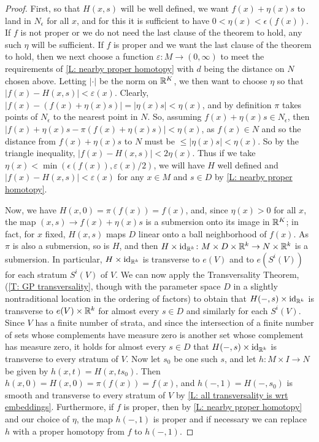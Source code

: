 \begin{proof}
	First, so that $H(x,s)$ will be well defined, we want $f(x)+ \eta(x)s$ to land in $N_\epsilon$ for all $x$, and for this it is sufficient to have $0< \eta(x) < \epsilon(f(x))$.
	If $f$ is not proper or we do not need the last clause of the theorem to hold, any such $\eta$ will be sufficient.
	If $f$ is proper and we want the last clause of the theorem to hold, then we next choose a function $\varepsilon \colon M \to (0,\infty)$ to meet the requirements of \cref{L: nearby proper homotopy} with $d$ being the distance on $N$ chosen above.
	Letting $|\cdot|$ be the norm on $\mathbb{R}^K$, we then want to choose $\eta$ so that $|f(x) - H(x,s)| < \varepsilon(x)$.
	Clearly, $|f(x) - (f(x)+ \eta(x)s)| = |\eta(x)s| < \eta(x)$, and by definition $\pi$ takes points of $N_\epsilon$ to the nearest point in $N$. So, assuming $f(x)+ \eta(x)s \in N_\epsilon$, then $|f(x)+ \eta(x)s - \pi(f(x)+ \eta(x)s)| < \eta(x)$, as $f(x) \in N$ and so the distance from $f(x)+ \eta(x)s$ to $N$ must be $\leq |\eta(x)s| < \eta(x)$.
	So by the triangle inequality, $|f(x) - H(x,s)| < 2\eta(x)$.
	Thus if we take $\eta(x) < \min(\epsilon(f(x)), \varepsilon(x)/2)$, we will have $H$ well defined and $|f(x) - H(x,s)| < \varepsilon(x)$ for any $x \in M$ and $s \in D$ by \cref{L: nearby proper homotopy}.

	Now, we have $H(x,0) = \pi(f(x)) = f(x)$, and, since $\eta(x)>0$ for all $x$, the map $(x,s) \to f(x)+ \eta(x)s$ is a submersion onto its image in $\mathbb{R}^K$; in fact, for $x$ fixed, $H(x,s)$ maps $D$ linear onto a ball neighborhood of $f(x)$.
	As $\pi$ is also a submersion, so is $H$, and then $H \times \mathrm{id}_{\mathbb{R}^k} \colon M \times D \times \mathbb{R}^k \to N \times \mathbb{R}^k$ is a submersion.
	In particular, $H \times \mathrm{id}_{\mathbb{R}^k}$ is transverse to $e(V)$ and to $e(S^i(V))$ for each stratum $S^i(V)$ of $V$.
	We can now apply the Transversality Theorem, (\cref{T: GP transversality}, though with the parameter space $D$ in a slightly nontraditional location in the ordering of factors) to obtain that $H(-,s) \times \mathrm{id}_{\mathbb{R}^k}$ is transverse to $e(V) \times \mathbb{R}^k$ for almost every $s \in D$ and similarly for each $S^i(V)$.
	Since $V$ has a finite number of strata, and since the intersection of a finite number of sets whose complements have measure zero is another set whose complement has measure zero, it holds for almost every $s \in D$ that $H(-,s) \times \mathrm{id}_{\mathbb{R}^k}$ is transverse to every stratum of $V$.
	Now let $s_0$ be one such $s$, and let $h \colon M \times I \to N$ be given by $h(x,t) = H(x,ts_0)$.
	Then $h(x,0) = H(x,0) = \pi(f(x)) = f(x)$, and $h(-,1) = H(-,s_0)$ is smooth and transverse to every stratum of $V$ by \cref{L: all transversality is wrt embeddings}.
	Furthermore, if $f$ is proper, then by \cref{L: nearby proper homotopy} and our choice of $\eta$, the map $h(-,1)$ is proper and if necessary we can replace $h$ with a proper homotopy from $f$ to $h(-,1)$. \qedhere


\end{proof}
